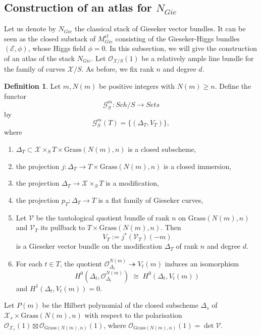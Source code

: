 \documentclass[11pt]{amsart}
\theoremstyle{plain}
\numberwithin{equation}{section}
\theoremstyle{definition}
\newtheorem{Def}{Definition}[section]
\theoremstyle{plain}
\begin{document}
\smallskip


\subsection{Construction of an atlas for $N_{Gie}$}\label{Atlas1}

Let us denote by $N_{Gie}$ the classical stack of Gieseker vector bundles. It can be seen as the closed substack of $M^{cl}_{Gie}$ consisting of the Gieseker-Higgs bundles $(\mathcal E, \phi)$, whose Higgs field $\phi=0$. In this subsection, we will give the construction of an atlas of the stack $N_{Gie}$. Let $\mathcal{O}_{\mathcal{X}/S}(1)$ be a relatively ample line bundle for the family of curves $\mathcal{X}/S$. As before, we fix rank $n$ and degree $d$.

\begin{Def}
Let $m, N(m)$ be positive integers with $N(m) \geq n$. Define the functor
\[
\mathcal{G}^{m}_S : {Sch}/S \longrightarrow {Sets}
\]
by
\[
\mathcal{G}^{m}_S(T) = \{(\Delta_T, V_T)\},
\]
where

\begin{enumerate}
\item $\Delta_T \subset \mathcal{X} \times_S T \times \mathrm{Grass}(N(m),n)$ is a closed subscheme,
\item the projection $j : \Delta_T \to T \times \mathrm{Grass}(N(m),n)$ is a closed immersion,
\item the projection $\Delta_T \to \mathcal{X} \times_S T$ is a modification,
\item the projection $p_T : \Delta_T \to T$ is a flat family of Gieseker curves,
\item Let $\mathcal{V}$ be the tautological quotient bundle of rank $n$ on $\mathrm{Grass}(N(m),n)$ and $\mathcal{V}_T$ its pullback to $T \times \mathrm{Grass}(N(m),n)$. Then
   \[
   V_T := j^*(\mathcal{V}_T)(-m)
   \]
   is a Gieseker vector bundle on the modification $\Delta_T$ of rank $n$ and degree $d$.
\item For each $t \in T$, the quotient $\mathcal{O}_{\Delta_t}^{N(m)} \twoheadrightarrow V_t(m)$ induces an isomorphism
   \[
   H^0(\Delta_t, \mathcal{O}_{\Delta_t}^{N(m)}) \;\cong\; H^0(\Delta_t, V_t(m))
   \]
   and $H^1(\Delta_t, V_t(m)) = 0$.
\end{enumerate}
\end{Def}

Let $P(m)$ be the Hilbert polynomial of the closed subscheme $\Delta_s$ of $\mathcal{X}_s \times \mathrm{Grass}(N(m),n)$ with respect to the polarisation $\mathcal{O}_{\mathcal{X}_s}(1) \boxtimes \mathcal{O}_{\mathrm{Grass}(N(m),n)}(1)$, where $\mathcal{O}_{\mathrm{Grass}(N(m),n)}(1) = \det \mathcal{V}$.
\end{document}
